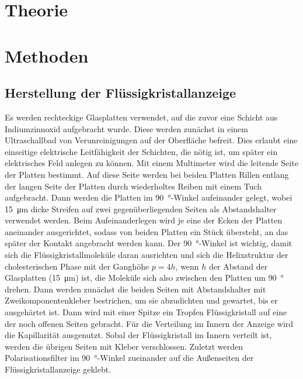 \documentclass[
	a4paper,
	12pt,
	pagesize,
	ngerman
]{scrartcl}
\begin{document}
	\section{Theorie}
	\section{Methoden}
	\subsection{Herstellung der Flüssigkristallanzeige}
	Es werden rechteckige Glasplatten verwendet, auf die zuvor eine Schicht aus Indiumzinnoxid aufgebracht wurde.
	Diese werden zunächst in einem Ultraschallbad von Verunreinigungen auf der Oberfläche befreit. %
	Dies erlaubt eine einseitige elektrische Leitfähigkeit der Schichten, die nötig ist, um später ein elektrisches Feld anlegen zu können. %
	Mit einem Multimeter wird die leitende Seite der Platten bestimmt.
	Auf diese Seite werden bei beiden Platten Rillen entlang der langen Seite der Platten durch wiederholtes Reiben mit einem Tuch aufgebracht.
	Dann werden die Platten im \SI{90}{\degree}-Winkel aufeinander gelegt, wobei \SI{15}{\micro \meter} dicke Streifen auf zwei gegenüberliegenden Seiten als Abstandshalter verwendet werden.
	Beim Aufeinanderlegen wird je eine der Ecken der Platten aneinander ausgerichtet, sodass von beiden Platten ein Stück übersteht, an das später der Kontakt angebracht werden kann.
	Der \SI{90}{\degree}-Winkel ist wichtig, damit sich die Flüssigkristallmoleküle daran ausrichten und sich die Helixstruktur der cholesterischen Phase mit der Ganghöhe $p=4h$, wenn $h$ der Abstand der Glasplatten (\SI{15}{\micro \meter}) ist, die Moleküle sich also zwischen den Platten um \SI{90}{\degree} drehen. %
	Dann werden zunächst die beiden Seiten mit Abstandshalter mit Zweikomponentenkleber bestrichen, um sie abzudichten und gewartet, bis er ausgehärtet ist.
	Dann wird mit einer Spitze ein Tropfen Flüssigkristall auf eine der noch offenen Seiten gebracht. Für die Verteilung im Innern der Anzeige wird die Kapillarität ausgenutzt.
  Sobal der Flüssigkristall im Innern verteilt ist, werden die übrigen Seiten mit Kleber verschlossen.
	Zuletzt werden Polarisationsfilter im \SI{90}{\degree}-Winkel zueinander auf die Außenseiten der Flüssigkristallanzeige geklebt.
\end{document}
